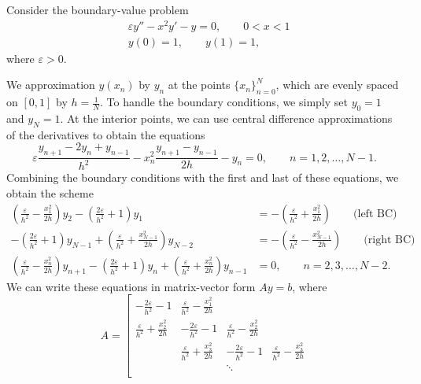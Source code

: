 \documentclass{homework}
\begin{document}
	\question Consider the boundary-value problem
	\begin{align*}
		&\varepsilon y'' - x^2y' - y = 0, \qquad 0 < x < 1\\
		&y(0) = 1, \qquad y(1) = 1,
	\end{align*}
	where $\varepsilon > 0$.
	
	\begin{alphaparts}
		\questionpart We approximation $y(x_n)$ by $y_n$ at the points $\{x_n\}_{n=0}^N$, which are evenly spaced on $[0,1]$ by $h = \frac{1}{N}$. To handle the boundary conditions, we simply set $y_0 = 1$ and $y_N = 1$. At the interior points, we can use central difference approximations of the derivatives to obtain the equations
		\begin{equation*}
			\varepsilon\frac{y_{n+1} - 2y_n + y_{n-1}}{h^2} -x_n^2\frac{y_{n+1} - y_{n-1}}{2h} - y_n = 0, \qquad n = 1, 2, \dots, N-1.
		\end{equation*}
		Combining the boundary conditions with the first and last of these equations, we obtain the scheme
		\begin{align*}
			\left(\frac{\varepsilon}{h^2} - \frac{x_1^2}{2h}\right)y_{2} - \left(\frac{2\varepsilon}{h^2} + 1\right)y_1 &= -\left(\frac{\varepsilon}{h^2} + \frac{x_1^2}{2h}\right) \qquad \text{(left BC)}\\
			- \left(\frac{2\varepsilon}{h^2} + 1\right)y_{N-1} + \left(\frac{\varepsilon}{h^2} + \frac{x_{N-1}^2}{2h}\right)y_{N-2} &= -\left(\frac{\varepsilon}{h^2} - \frac{x_{N-1}^2}{2h}\right) \qquad \text{(right BC)}\\
			\left(\frac{\varepsilon}{h^2} - \frac{x_n^2}{2h}\right)y_{n+1} - \left(\frac{2\varepsilon}{h^2} + 1\right)y_n + \left(\frac{\varepsilon}{h^2} + \frac{x_n^2}{2h}\right)y_{n-1} &= 0, \qquad n = 2, 3, \dots, N-2.
		\end{align*}
		We can write these equations in matrix-vector form $Ay = b$, where
		\begin{equation*}
			A = \left[\begin{matrix}
				-\frac{2\varepsilon}{h^2} - 1 & \frac{\varepsilon}{h^2} - \frac{x_1^2}{2h} \\
				\frac{\varepsilon}{h^2} + \frac{x_2^2}{2h} & -\frac{2\varepsilon}{h^2} - 1 & \frac{\varepsilon}{h^2} - \frac{x_2^2}{2h} \\
				& \frac{\varepsilon}{h^2} + \frac{x_3^2}{2h} & -\frac{2\varepsilon}{h^2} - 1 & \frac{\varepsilon}{h^2} - \frac{x_3^2}{2h} \\
				& & \ddots\\

\end{matrix}
\end{equation*}
\end{alphaparts}
\end{document}
